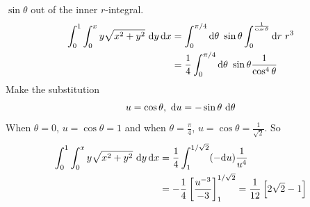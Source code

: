 \begin{eg}
$\sin\theta$ out of the inner $r$-integral.
\begin{align*}
\int_0^1\int_0^x y\sqrt{x^2+y^2}\ \dee{y}\,\dee{x}
&=\int_0^{\pi/4}\dee{\theta}\ \sin\theta\int_0^{\frac{1}{\cos\theta}}\dee{r}\ 
     r^3 \\
&=\frac{1}{4}\int_0^{\pi/4}\dee{\theta}\ \sin\theta\frac{1}{\cos^4\theta} 
\end{align*}
Make the substitution
\begin{equation*}
u=\cos\theta,\ \dee{u}=-\sin\theta\ \dee{\theta}
\end{equation*}
When $\theta=0$, $u=\cos\theta=1$ and when $\theta=\frac{\pi}{4}$,
$u=\cos\theta=\frac{1}{\sqrt{2}}$. So
\begin{align*}
\int_0^1\int_0^x y\sqrt{x^2+y^2}\ \mathrm{d}y\,\mathrm{d}x
&=\frac{1}{4}\int_1^{1/\sqrt{2}} (-\mathrm{d}u)\frac{1}{u^4}  \\
&=-\frac{1}{4}\left[\frac{u^{-3}}{-3}\right]_1^{1/\sqrt{2}} 
=\frac{1}{12}\left[2\sqrt{2}-1\right]
\end{align*}
\end{eg}

